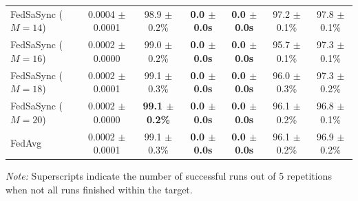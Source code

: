 \begin{table}[t]
{\begin{tabular}{lcccccc}
FedSaSync ($M = 14$) & 0.0004 $\pm$ 0.0001 & 98.9 $\pm$ 0.2\% & \textbf{0.0 $\pm$ 0.0s} & \textbf{0.0 $\pm$ 0.0s} & 97.2 $\pm$ 0.1\% & 97.8 $\pm$ 0.1\% \\
FedSaSync ($M = 16$) & 0.0002 $\pm$ 0.0000 & 99.0 $\pm$ 0.2\% & \textbf{0.0 $\pm$ 0.0s} & \textbf{0.0 $\pm$ 0.0s} & 95.7 $\pm$ 0.1\% & 97.3 $\pm$ 0.1\% \\
FedSaSync ($M = 18$) & 0.0002 $\pm$ 0.0001 & 99.1 $\pm$ 0.3\% & \textbf{0.0 $\pm$ 0.0s} & \textbf{0.0 $\pm$ 0.0s} & 96.0 $\pm$ 0.3\% & 97.3 $\pm$ 0.2\% \\
FedSaSync ($M = 20$) & 0.0002 $\pm$ 0.0000 & \textbf{99.1 $\pm$ 0.2\%} & \textbf{0.0 $\pm$ 0.0s} & \textbf{0.0 $\pm$ 0.0s} & 96.1 $\pm$ 0.2\% & 96.8 $\pm$ 0.1\% \\
FedAvg & 0.0002 $\pm$ 0.0001 & 99.1 $\pm$ 0.3\% & \textbf{0.0 $\pm$ 0.0s} & \textbf{0.0 $\pm$ 0.0s} & 96.1 $\pm$ 0.2\% & 96.9 $\pm$ 0.2\% \\
\hline
\end{tabular}%
}
\par\vspace{0.8em}
\raggedright \footnotesize \textit{Note:} Superscripts indicate the number of successful runs out of 5 repetitions when not all runs finished within the target.
\end{table}